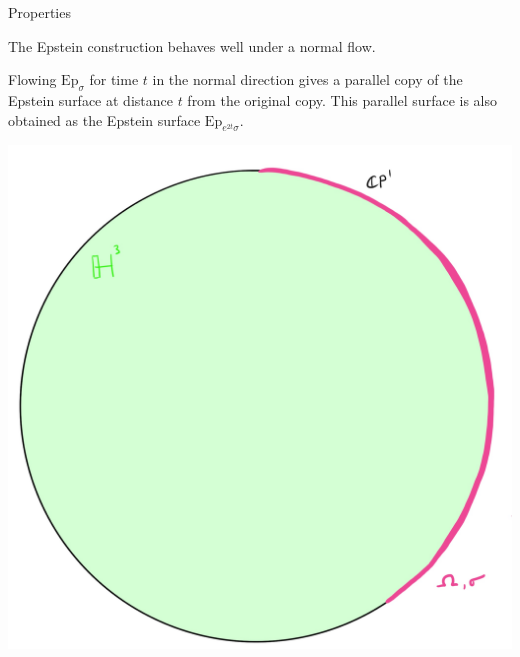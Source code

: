 \documentclass[professionalfont]{beamer}
\begin{document}
\begin{frame}{Properties}

The Epstein construction behaves well under a normal flow. 

Flowing $\mathrm{Ep}_\sigma$ for time $t$ in the normal direction gives a parallel copy of the Epstein surface at distance $t$ from the original copy. This parallel surface is also obtained as the Epstein surface $\mathrm{Ep}_{e^{2t}\sigma}$.

\centering\includegraphics[scale=0.09]{Parallel-1.jpg}

\end{frame}


\end{document}
